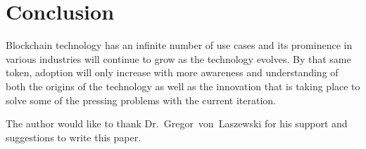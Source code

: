 \section{Conclusion}

Blockchain technology has an infinite number of use cases and its prominence in various industries will continue to grow as the technology evolves. By that same token, adoption will only increase with more awareness and understanding of both the origins of the technology as well as the innovation that is taking place to solve some of the pressing problems with the current iteration.


\begin{acks}

  The author would like to thank Dr.~Gregor~von~Laszewski for his
  support and suggestions to write this paper.

\end{acks}


 
